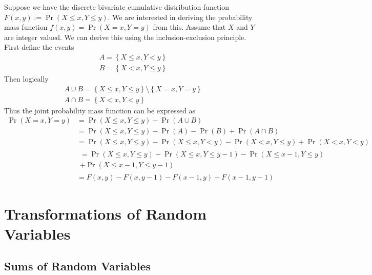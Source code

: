\documentclass[11pt]{report} %
\begin{document}
Suppose we have the discrete bivariate cumulative distribution function $F\left(x, y\right) := \operatorname{Pr}\left(X\leq x, Y \leq y\right)$. We are interested in deriving the probability mass function $f\left(x, y\right) = \operatorname{Pr}\left(X = x, Y = y\right)$ from this. Assume that $X$ and $Y$ are integer valued. We can derive this using the inclusion-exclusion principle. First define the events
\begin{gather}
A = \left\{X \leq x, Y < y\right\} \\
B = \left\{X < x, Y \leq y\right\}
\end{gather}
Then logically
\begin{gather}
A \cup B =  \left\{X \leq x, Y \leq y\right\}\setminus\left\{X = x, Y = y\right\} \\
A \cap B = \left\{X < x, Y < y\right\}
\end{gather}
Thus the joint probability mass function can be expressed as
\begin{align}
\operatorname{Pr}\left(X = x, Y = y\right) &= \operatorname{Pr}\left(X \leq x, Y \leq y\right) - \operatorname{Pr}\left(A \cup B\right) \\
&= \operatorname{Pr}\left(X \leq x, Y \leq y\right) - \operatorname{Pr}\left(A\right) - \operatorname{Pr}\left(B\right) + \operatorname{Pr}\left(A \cap B\right) \\
&= \operatorname{Pr}\left(X \leq x, Y \leq y\right) - \operatorname{Pr}\left(X \leq x, Y < y\right) - \operatorname{Pr}\left(X < x, Y \leq y\right) + \operatorname{Pr}\left(X < x, Y < y\right) \\
&\begin{multlined} =\operatorname{Pr}\left(X \leq x, Y \leq y\right) - \operatorname{Pr}\left(X \leq x, Y \leq y - 1\right) - \operatorname{Pr}\left(X \leq x - 1, Y \leq y\right) \\
+ \operatorname{Pr}\left(X \leq x - 1, Y \leq y - 1\right) \end{multlined} \\
&= F\left(x, y\right) - F\left(x, y - 1\right) - F\left(x - 1, y\right) + F\left(x - 1, y - 1\right)
\end{align}

\section{Transformations of Random Variables}

\subsection{Sums of Random Variables}
\end{document}
